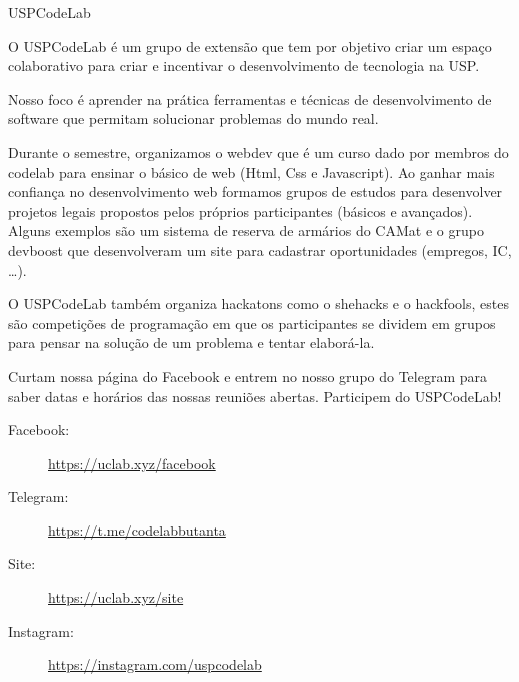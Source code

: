 \begin{subsecao}{USPCodeLab}


O USPCodeLab é um grupo de extensão que tem por objetivo criar um espaço
colaborativo para criar e incentivar o desenvolvimento de tecnologia na USP.

Nosso foco é aprender na prática ferramentas e técnicas de desenvolvimento de software que permitam
solucionar problemas do mundo real.

Durante o semestre, organizamos o webdev que é um curso dado por membros do codelab para ensinar o
básico de web (Html, Css e Javascript). Ao ganhar mais confiança no desenvolvimento web formamos
grupos de estudos para desenvolver projetos legais propostos pelos próprios participantes (básicos
e avançados). Alguns exemplos são um sistema de reserva de armários do CAMat e o grupo devboost que
desenvolveram um site para cadastrar oportunidades (empregos, IC, \dots). 

O USPCodeLab também organiza hackatons como o shehacks e o hackfools, estes são competições de
programação em que os participantes se dividem em grupos para pensar na solução de um problema e tentar
elaborá-la.

Curtam nossa página do Facebook e entrem no nosso grupo do Telegram para saber
datas e horários das nossas reuniões abertas. Participem do USPCodeLab!

\begin{description}
\item[Facebook:] \url{https://uclab.xyz/facebook}
\item[Telegram:] \url{https://t.me/codelabbutanta}
\item[Site:] \url{https://uclab.xyz/site}
\item[Instagram:] \url{https://instagram.com/uspcodelab}
\end{description}

\end{subsecao}
